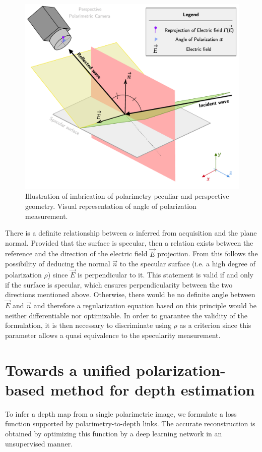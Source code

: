 \begin{figure}[h]
	\centering
	\vspace{0.1cm}
	\includegraphics[keepaspectratio,width=.8\linewidth]{Figures/ECCV/foundations_prev.pdf}
	\caption{Illustration of imbrication of polarimetry peculiar and perspective geometry. Visual representation of angle of polarization measurement.}
	\label{fig:found}
\end{figure}

There is a definite relationship between $\alpha$ inferred from acquisition and the plane normal. Provided that the surface is specular, then a relation exists between the reference and the direction of the electric field $\vec{E}$ projection.
From this follows the possibility of deducing the normal $\vec{n}$ to the specular surface (i.e. a high degree of polarization $\rho$) since $\vec{E}$ is perpendicular to it. This statement is valid if and only if the surface is specular, which ensures perpendicularity between the two directions mentioned above. Otherwise, there would be no definite angle between $\vec{E}$ and $\vec{n}$ and therefore a regularization equation based on this principle would be neither differentiable nor optimizable. 
In order to guarantee the validity of the formulation, it is then necessary to discriminate using $\rho$ as a criterion since this parameter allows a quasi equivalence to the specularity measurement. 

\section{Towards a unified polarization-based method for depth estimation}
To infer a depth map from a single polarimetric image, we formulate a loss function supported by polarimetry-to-depth links. The accurate reconstruction is obtained by optimizing this function by a deep learning network in an unsupervised manner.
